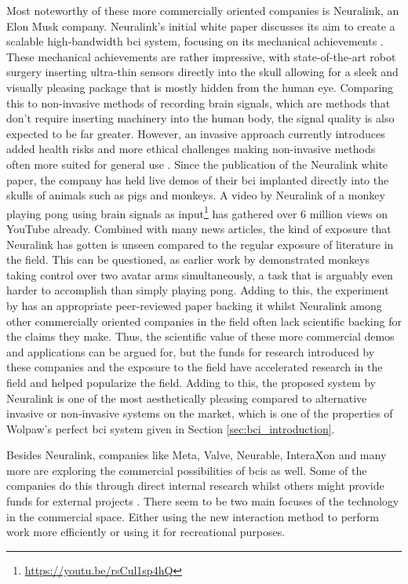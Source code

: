Most noteworthy of these more commercially oriented companies is Neuralink, an Elon Musk company.
Neuralink's initial white paper discusses its aim to create a scalable high-bandwidth \gls{bci} system, focusing on its mechanical achievements \citep{neuralink_whitepaper}.
These mechanical achievements are rather impressive, with state-of-the-art robot surgery inserting ultra-thin sensors directly into the skull allowing for a sleek and visually pleasing package that is mostly hidden from the human eye.
Comparing this to non-invasive methods of recording brain signals, which are methods that don't require inserting machinery into the human body, the signal quality is also expected to be far greater.
However, an invasive approach currently introduces added health risks and more ethical challenges making non-invasive methods often more suited for general use \citep{neuralink_ethics, neuralink_ethics2, bci_review_arnau}.
Since the publication of the Neuralink white paper, the company has held live demos of their \gls{bci} implanted directly into the skulls of animals such as pigs and monkeys.
A video by Neuralink of a monkey playing pong using brain signals as input\footnote{\url{https://youtu.be/rsCul1sp4hQ}} has gathered over 6 million views on YouTube already.
Combined with many news articles, the kind of exposure that Neuralink has gotten is unseen compared to the regular exposure of literature in the field.
This can be questioned, as earlier work by \citet{bci_monkey_arms} demonstrated monkeys taking control over two avatar arms simultaneously, a task that is arguably even harder to accomplish than simply playing pong.
Adding to this, the experiment by \citet{bci_monkey_arms} has an appropriate peer-reviewed paper backing it whilst Neuralink among other commercially oriented companies in the field often lack scientific backing for the claims they make.
Thus, the scientific value of these more commercial demos and applications can be argued for, but the funds for research introduced by these companies and the exposure to the field have accelerated research in the field and helped popularize the field.
Adding to this, the proposed system by Neuralink is one of the most aesthetically pleasing compared to alternative invasive or non-invasive systems on the market, which is one of the properties of Wolpaw's perfect \gls{bci} system given in Section \ref{sec:bci_introduction}.

Besides Neuralink, companies like Meta, Valve, Neurable, InteraXon and many more are exploring the commercial possibilities of \glspl{bci} as well.
Some of the companies do this through direct internal research whilst others might provide funds for external projects \citep{facebook_bci_keyboard, valve_bci_interest, neurable_white_paper, interaxon_tests}.
There seem to be two main focuses of the technology in the commercial space.
Either using the new interaction method to perform work more efficiently or using it for recreational purposes.

